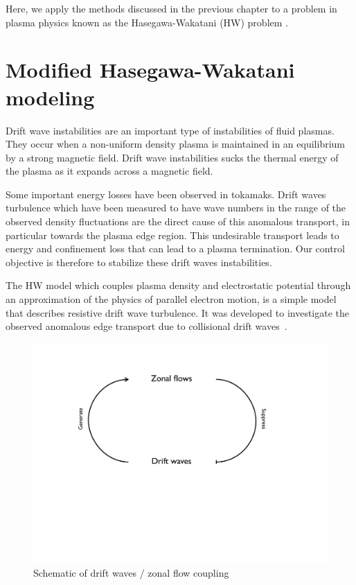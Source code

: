 \documentclass[12pt,lot, lof]{puthesis}
\begin{document}
Here, we apply the methods discussed in the previous chapter to a problem in plasma physics known as
the Hasegawa-Wakatani (HW) problem \cite{Hasegawa1,Hasegawa2}.
\section{Modified Hasegawa-Wakatani modeling}

Drift wave instabilities are an important type of instabilities of fluid plasmas. They occur when a non-uniform density plasma is maintained in an equilibrium by a strong magnetic field. Drift wave instabilities sucks the thermal energy of the plasma as it expands across a magnetic field.

Some important energy losses have been observed in tokamaks. Drift waves turbulence which have been measured to have wave numbers in the range of the observed density fluctuations are the direct cause of this anomalous transport, in particular towards the plasma edge region. This undesirable transport leads to energy and confinement loss that can lead to a plasma termination. Our control objective is therefore to stabilize these drift waves instabilities.

The HW model which couples plasma density and electrostatic potential through an approximation of the physics of parallel electron motion, is a simple model that describes resistive drift wave turbulence. It was developed to investigate the observed anomalous edge transport due to collisional drift waves~\cite{Horton}.

\begin{figure}[htbp]
\centering
\includegraphics [width=0.7\linewidth]{rel} 
\caption{Schematic of drift waves / zonal flow coupling}
\label{rel}
\end{figure}
\end{document}
